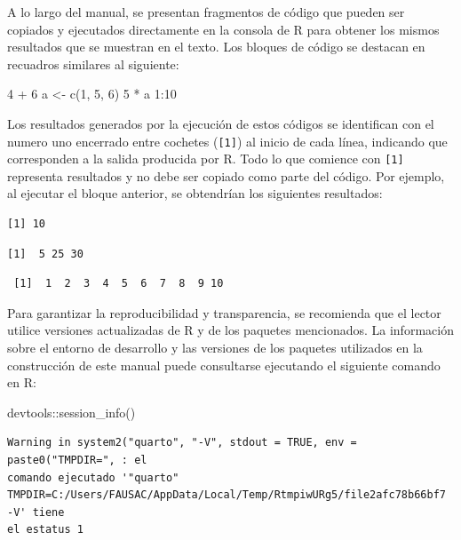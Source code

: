 \documentclass[
  spanish,
  a4paper,
  DIV=11,
  numbers=noendperiod,
  onepage,
  openany]{scrreprt}
\newenvironment{Shaded}{\begin{snugshade}}{\end{snugshade}}
\newcommand{\DecValTok}[1]{\textcolor[rgb]{0.68,0.00,0.00}{#1}}
\newcommand{\FunctionTok}[1]{\textcolor[rgb]{0.28,0.35,0.67}{#1}}
\newcommand{\NormalTok}[1]{\textcolor[rgb]{0.00,0.23,0.31}{#1}}
\newcommand{\OtherTok}[1]{\textcolor[rgb]{0.00,0.23,0.31}{#1}}
\newcommand{\SpecialCharTok}[1]{\textcolor[rgb]{0.37,0.37,0.37}{#1}}
\begin{document}
A lo largo del manual, se presentan fragmentos de código que pueden ser
copiados y ejecutados directamente en la consola de R para obtener los
mismos resultados que se muestran en el texto. Los bloques de código se
destacan en recuadros similares al siguiente:

\begin{Shaded}
\begin{Highlighting}[]
\DecValTok{4} \SpecialCharTok{+} \DecValTok{6}
\NormalTok{a }\OtherTok{\textless{}{-}} \FunctionTok{c}\NormalTok{(}\DecValTok{1}\NormalTok{, }\DecValTok{5}\NormalTok{, }\DecValTok{6}\NormalTok{)}
\DecValTok{5} \SpecialCharTok{*}\NormalTok{ a}
\DecValTok{1}\SpecialCharTok{:}\DecValTok{10}
\end{Highlighting}
\end{Shaded}

Los resultados generados por la ejecución de estos códigos se
identifican con el numero uno encerrado entre cochetes
(\texttt{{[}1{]}}) al inicio de cada línea, indicando que corresponden a
la salida producida por R. Todo lo que comience con \texttt{{[}1{]}}
representa resultados y no debe ser copiado como parte del código. Por
ejemplo, al ejecutar el bloque anterior, se obtendrían los siguientes
resultados:

\begin{verbatim}
[1] 10
\end{verbatim}

\begin{verbatim}
[1]  5 25 30
\end{verbatim}

\begin{verbatim}
 [1]  1  2  3  4  5  6  7  8  9 10
\end{verbatim}

Para garantizar la reproducibilidad y transparencia, se recomienda que
el lector utilice versiones actualizadas de R y de los paquetes
mencionados. La información sobre el entorno de desarrollo y las
versiones de los paquetes utilizados en la construcción de este manual
puede consultarse ejecutando el siguiente comando en R:

\begin{Shaded}
\begin{Highlighting}[]
\NormalTok{devtools}\SpecialCharTok{::}\FunctionTok{session\_info}\NormalTok{()}
\end{Highlighting}
\end{Shaded}

\begin{verbatim}
Warning in system2("quarto", "-V", stdout = TRUE, env = paste0("TMPDIR=", : el
comando ejecutado '"quarto"
TMPDIR=C:/Users/FAUSAC/AppData/Local/Temp/RtmpiwURg5/file2afc78b66bf7 -V' tiene
el estatus 1
\end{verbatim}
\end{document}
